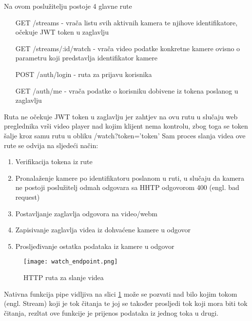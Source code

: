  \label{sec:routes}
Na ovom poslužitelju postoje 4 glavne rute
\begin{itemize}
  \item [GET] /streams - vrača listu svih aktivnih kamera te njihove identifikatore, očekuje JWT token u zaglavlju
  \item [GET] /streams/:id/watch - vrača video podatke konkretne kamere ovisno o \\ 
    parametru  koji predstavlja identifikator kamere
  \item [POST] /auth/login - ruta za prijavu korisnika
  \item [GET] /auth/me - vrača podatke o korisniku dobivene iz tokena poslanog u zaglavlju
\end{itemize}
\noindent
Ruta  ne očekuje JWT token u zaglavlju jer zahtjev na ovu rutu u slučaju web preglednika vrši
 video player nad kojim klijent nema kontrolu, zbog toga se token šalje kroz samu rutu u obliku
/watch?token='token'
\paraBreak
Sam proces slanja videa ove rute se odvija na sljedeći način:
\begin{enumerate}
  \item Verifikacija tokena iz rute
  \item Pronalaženje kamere po identifikatoru poslanom u ruti, u slučaju da kamera ne postoji poslužitelj odmah odgovara
    sa HHTP odgovorom 400 (engl. bad request)
  \item Postavljanje zaglavlja odgovora  na video/webm
  \item Zapisivanje zaglavlja videa iz dohvaćene kamere u odgovor
  \item Prosljeđivanje ostatka podataka iz kamere u odgovor
\end{enumerate}

\begin{figure}[h]
  \texttt{[image: watch\_endpoint.png]}
  \caption{HTTP ruta za slanje videa}
  \label{pic:streaming}
\end{figure}
\noindent Nativna  funkcija pipe vidljiva na slici \ref{pic:streaming} može se pozvati nad bilo kojim tokom (engl. Stream) koji je tok čitanja
te joj se također prosljedi tok koji mora biti tok čitanja, rezltat ove funkcije je prijenos podataka iz jednog toka u
drugi.
